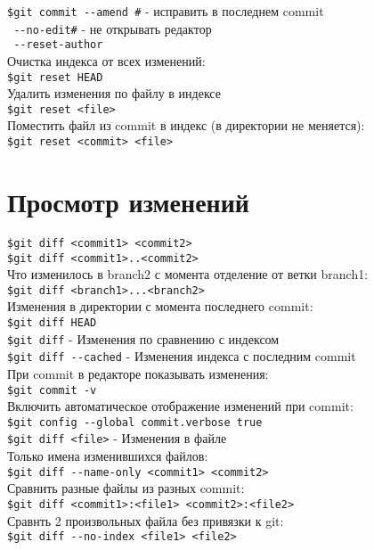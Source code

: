 \documentclass[12pt, a4paper]{article}
\begin{document}
\noindent \texttt{\$git commit {-}-amend \indent\#}  - исправить в последнем commit \\
\indent \texttt{ {-}-no-edit\indent\#} - не открывать редактор \\ 
\indent \texttt{ {-}-reset-author} \\

\noindent Очистка индекса от всех изменений: \\
\indent \texttt{\$git reset HEAD} \\
\noindent Удалить изменения по файлу в индексе \\
\indent \texttt{\$git reset <file>} \\
\noindent Поместить файл из commit в индекс (в директории не меняется):\\
\indent \texttt{\$git reset <commit> <file>} \\


\section{Просмотр изменений}

\noindent \texttt{\$git diff <commit1> <commit2>} \\
\noindent \texttt{\$git diff <commit1>..<commit2>} \\

\noindent Что изменилось в branch2 с момента отделение от ветки branch1: \\
\indent \texttt{\$git diff <branch1>...<branch2>} \\
\noindent Изменения в директории с момента последнего commit: \\
\indent \texttt{\$git diff HEAD} \\
\noindent \texttt{\$git diff} - Изменения по сравнению с индексом \\
\noindent \texttt{\$git diff {-}-cached} - Изменения индекса с последним commit \\

\noindent При commit в редакторе показывать изменения: \\
\indent \texttt{\$git commit -v} \\
\noindent Включить автоматическое отображение изменений при commit: \\
\indent \texttt{\$git config {-}-global commit.verbose true} \\

\noindent \texttt{\$git diff <file>} - Изменения в файле \\
\noindent Только имена изменившихся файлов: \\
\indent \texttt{\$git diff {-}-name-only <commit1> <commit2>}\\
\noindent Сравнить разные файлы из разных commit: \\
\indent \texttt{\$git diff <commit1>:<file1> <commit2>:<file2>} \\
\noindent Сравнть 2 произвольных файла без привязки к git: \\
\indent \texttt{\$git diff {-}-no-index <file1> <file2>} \\
\end{document}

